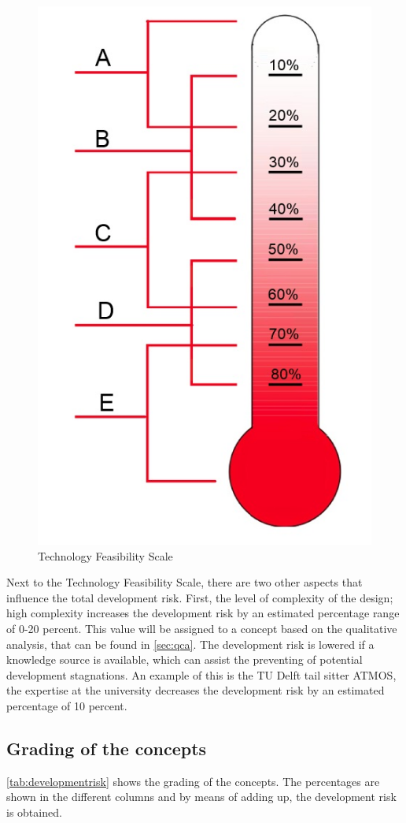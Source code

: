 \begin{figure}[htb]
    \centering
    \includegraphics[width=.30\textwidth]{DevelopmentRisk/Figures/DRS.jpg}
    \caption{Technology Feasibility Scale}
    \label{fig:DRS}
\end{figure}

Next to the Technology Feasibility Scale, there are two other aspects that influence the total development risk. First, the level of complexity of the design; high complexity increases the development risk by an estimated percentage range of 0-20 percent. This value will be assigned to a concept based on the qualitative analysis, that can be found in \autoref{sec:qca}. The development risk is lowered if a knowledge source is available, which can assist the preventing of potential development stagnations. An example of this is the TU Delft tail sitter ATMOS, the expertise at the university decreases the development risk by an estimated percentage of 10 percent. 

\subsection{Grading of the concepts}

\autoref{tab:developmentrisk} shows the grading of the concepts. The percentages are shown in the different columns and by means of adding up, the development risk is obtained.

